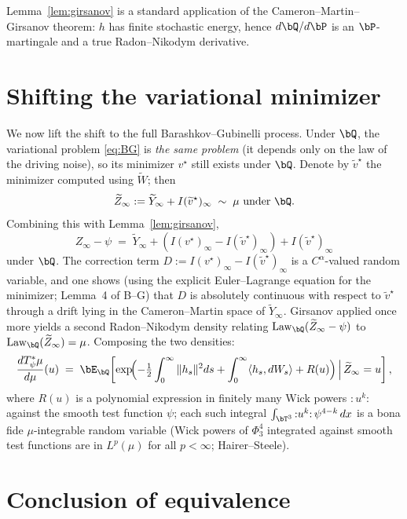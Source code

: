 Lemma~\ref{lem:girsanov} is a standard application of the Cameron--Martin--Girsanov theorem: $h$ has finite stochastic energy, hence $d\bQ/d\bP$ is an $\bP$-martingale and a true Radon--Nikodym derivative.

\section{Shifting the variational minimizer}

We now lift the shift to the full Barashkov--Gubinelli process. Under $\bQ$, the variational problem \eqref{eq:BG} is \emph{the same problem} (it depends only on the law of the driving noise), so its minimizer $v^\star$ still exists under $\bQ$. Denote by $\widetilde v^\star$ the minimizer computed using $\widetilde W$; then
\[
   \widetilde Z_\infty := \widetilde Y_\infty + I(\widetilde v^\star)_\infty \;\sim\; \mu \text{ under } \bQ.
\]
Combining this with Lemma~\ref{lem:girsanov},
\[
   Z_\infty - \psi \;=\; \widetilde Y_\infty + (I(v^\star)_\infty - I(\widetilde v^\star)_\infty) + I(\widetilde v^\star)_\infty
\]
under $\bQ$. The correction term $D := I(v^\star)_\infty - I(\widetilde v^\star)_\infty$ is a $C^\alpha$-valued random variable, and one shows (using the explicit Euler--Lagrange equation for the minimizer; Lemma~4 of B--G) that $D$ is absolutely continuous with respect to $\widetilde v^\star$ through a drift lying in the Cameron--Martin space of $\widetilde Y_\infty$. Girsanov applied once more yields a second Radon--Nikodym density relating $\mathrm{Law}_\bQ(\widetilde Z_\infty-\psi)$ to $\mathrm{Law}_\bQ(\widetilde Z_\infty) = \mu$. Composing the two densities:
\begin{equation}\label{eq:RN}
   \frac{dT_\psi^*\mu}{d\mu}(u) \;=\; \bE_\bQ\!\left[\exp\!\Bigl(-\tfrac12\int_0^\infty\|h_s\|^2 ds + \int_0^\infty\langle h_s,dW_s\rangle + R(u)\Bigr)\,\Big|\, \widetilde Z_\infty = u\right],
\end{equation}
where $R(u)$ is a polynomial expression in finitely many Wick powers ${:}u^k{:}$ against the smooth test function $\psi$; each such integral $\int_{\bT^3} {:}u^k{:}\,\psi^{4-k}\,dx$ is a bona fide $\mu$-integrable random variable (Wick powers of $\Phi^4_3$ integrated against smooth test functions are in $L^p(\mu)$ for all $p<\infty$; Hairer--Steele).

\section{Conclusion of equivalence}

